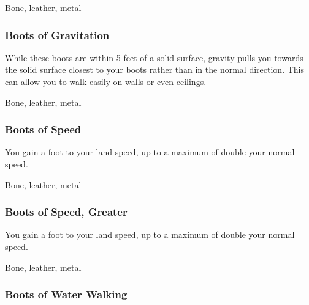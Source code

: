  Bone, leather, metal


\lowercase{\hypertarget{item:Boots of Gravitation}{}}\label{item:Boots of Gravitation}
\hypertarget{item:Boots of Gravitation}{\subsubsection{Boots of Gravitation\hfill{}}}

While these boots are within 5 feet of a solid surface, gravity pulls you towards the solid surface closest to your boots rather than in the normal direction.
This can allow you to walk easily on walls or even ceilings.



 Bone, leather, metal


\lowercase{\hypertarget{item:Boots of Speed}{}}\label{item:Boots of Speed}
\hypertarget{item:Boots of Speed}{\subsubsection{Boots of Speed\hfill{}}}

You gain a  foot  to your land speed, up to a maximum of double your normal speed.



 


 Bone, leather, metal


\lowercase{\hypertarget{item:Boots of Speed, Greater}{}}\label{item:Boots of Speed, Greater}
\hypertarget{item:Boots of Speed, Greater}{\subsubsection{Boots of Speed, Greater\hfill{}}}

You gain a  foot  to your land speed, up to a maximum of double your normal speed.



 


 Bone, leather, metal


\lowercase{\hypertarget{item:Boots of Water Walking}{}}\label{item:Boots of Water Walking}
\hypertarget{item:Boots of Water Walking}{\subsubsection{Boots of Water Walking\hfill{}}}

